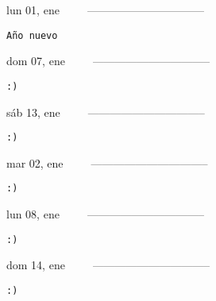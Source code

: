 \documentclass[letterpaper,10pt]{article}
\begin{document}
\begin{multicols}{3}
{lun 01, ene\ \ \ \ \ --------------------------------}
\begin{flushright}\begin{small}\texttt{Año nuevo}\end{small}\end{flushright}
\vfill
{dom 07, ene\ \ \ \ \ --------------------------------}
\begin{flushright}\begin{small}\texttt{:)}\end{small}\end{flushright}\par
\vfill
{sáb 13, ene\ \ \ \ \ --------------------------------}
\begin{flushright}\begin{small}\texttt{:)}\end{small}\end{flushright}\par
\vfill
\end{multicols}
\vspace{1.05cm}

\begin{multicols}{3}
{mar 02, ene\ \ \ \ \ --------------------------------}
\begin{flushright}\begin{small}\texttt{:)}\end{small}\end{flushright}
\vfill
{lun 08, ene\ \ \ \ \ --------------------------------}
\begin{flushright}\begin{small}\texttt{:)}\end{small}\end{flushright}\par
\vfill
{dom 14, ene\ \ \ \ \ --------------------------------}
\begin{flushright}\begin{small}\texttt{:)}\end{small}\end{flushright}\par
\vfill
\end{multicols}
\vspace{1.05cm}
\end{document}

